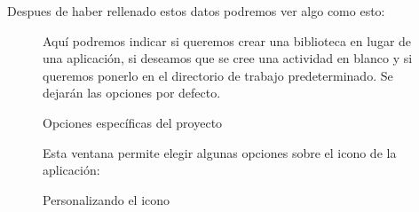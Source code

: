 \documentclass[a4paper,12pt,spanish]{sphinxmanual}
\begin{document}
Despues de haber rellenado estos datos podremos ver algo como esto:
\begin{figure}[htbp]
\centering
\capstart

\caption{Opciones específicas del proyecto}{\small 
Aquí podremos indicar si queremos crear una biblioteca en lugar de una aplicación, si deseamos que se cree una actividad en blanco y si queremos ponerlo en el directorio de trabajo predeterminado. Se dejarán las opciones por defecto.
}\end{figure}
\begin{figure}[htbp]
\centering
\capstart

\caption{Personalizando el icono}{\small 
Esta ventana permite elegir algunas opciones sobre el icono de la aplicación:
}\end{figure}
\end{document}
